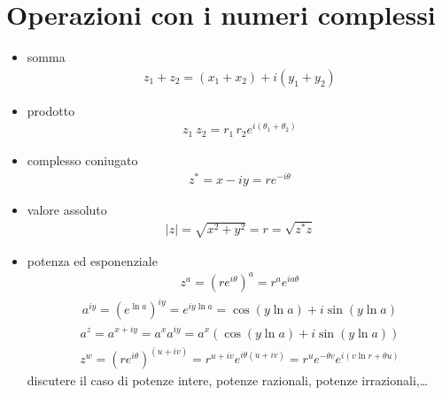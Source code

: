 \documentclass[letterpaper,10pt,italian]{jupyterBook}
\begin{document}
\section{Operazioni con i numeri complessi}
\label{\detokenize{ch/algebra/complex-algebra:operazioni-con-i-numeri-complessi}}\begin{itemize}
\item {} 
\sphinxAtStartPar
somma
\begin{equation*}
\begin{split}z_1 + z_2 = (x_1 + x_2) + i(y_1 + y_2)\end{split}
\end{equation*}
\item {} 
\sphinxAtStartPar
prodotto
\begin{equation*}
\begin{split}z_1 \ z_2 = r_1 \, r_2 e^{i(\theta_1 + \theta_2)}\end{split}
\end{equation*}
\item {} 
\sphinxAtStartPar
complesso coniugato
\begin{equation*}
\begin{split}z^* = x - i y = r e^{-i\theta} \end{split}
\end{equation*}
\item {} 
\sphinxAtStartPar
valore assoluto
\begin{equation*}
\begin{split}|z| = \sqrt{x^2 + y^2} = r = \sqrt{z^* z}\end{split}
\end{equation*}
\item {} 
\sphinxAtStartPar
potenza ed esponenziale
\begin{equation*}
\begin{split}z^a = \left(r e^{i\theta} \right)^a = r^a e^{i a \theta}\end{split}
\end{equation*}\begin{equation*}
\begin{split}a^{i y} = \left(e^{\ln a} \right)^{iy} = e^{i y \ln a} = \cos ( y \ln a ) + i \sin ( y \ln a )\end{split}
\end{equation*}\begin{equation*}
\begin{split}a^z = a^{x+iy} = a^x a^{iy} = a^x \left( \cos ( y \ln a ) + i \sin ( y \ln a ) \right)\end{split}
\end{equation*}\begin{equation*}
\begin{split}z^w = \left(r e^{i \theta}\right)^{( u + i v )} = r^{u+iv} e^{i \theta (u+iv)} = r^u e^{-\theta v} e^{i \left( v \ln r + \theta u \right)} \end{split}
\end{equation*}
\sphinxAtStartPar
{} discutere il caso di potenze intere, potenze razionali, potenze irrazionali,… 


\end{itemize}
\end{document}
